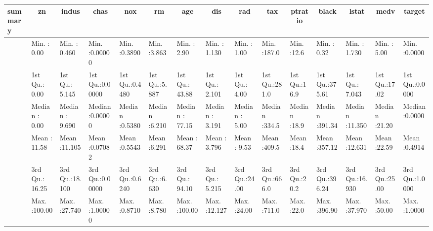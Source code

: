 \begin{table}[!tbp]
\begin{center}
\begin{tabular}{lllllllllllllll}
\hline\hline
\multicolumn{1}{l}{summary}&\multicolumn{1}{c}{      zn}&\multicolumn{1}{c}{    indus}&\multicolumn{1}{c}{     chas}&\multicolumn{1}{c}{     nox}&\multicolumn{1}{c}{      rm}&\multicolumn{1}{c}{     age}&\multicolumn{1}{c}{     dis}&\multicolumn{1}{c}{     rad}&\multicolumn{1}{c}{     tax}&\multicolumn{1}{c}{   ptratio}&\multicolumn{1}{c}{    black}&\multicolumn{1}{c}{    lstat}&\multicolumn{1}{c}{     medv}&\multicolumn{1}{c}{    target}\tabularnewline
\hline
&Min.   :  0.00  &Min.   : 0.460  &Min.   :0.00000  &Min.   :0.3890  &Min.   :3.863  &Min.   :  2.90  &Min.   : 1.130  &Min.   : 1.00  &Min.   :187.0  &Min.   :12.6  &Min.   :  0.32  &Min.   : 1.730  &Min.   : 5.00  &Min.   :0.0000  \tabularnewline
&1st Qu.:  0.00  &1st Qu.: 5.145  &1st Qu.:0.00000  &1st Qu.:0.4480  &1st Qu.:5.887  &1st Qu.: 43.88  &1st Qu.: 2.101  &1st Qu.: 4.00  &1st Qu.:281.0  &1st Qu.:16.9  &1st Qu.:375.61  &1st Qu.: 7.043  &1st Qu.:17.02  &1st Qu.:0.0000  \tabularnewline
&Median :  0.00  &Median : 9.690  &Median :0.00000  &Median :0.5380  &Median :6.210  &Median : 77.15  &Median : 3.191  &Median : 5.00  &Median :334.5  &Median :18.9  &Median :391.34  &Median :11.350  &Median :21.20  &Median :0.0000  \tabularnewline
&Mean   : 11.58  &Mean   :11.105  &Mean   :0.07082  &Mean   :0.5543  &Mean   :6.291  &Mean   : 68.37  &Mean   : 3.796  &Mean   : 9.53  &Mean   :409.5  &Mean   :18.4  &Mean   :357.12  &Mean   :12.631  &Mean   :22.59  &Mean   :0.4914  \tabularnewline
&3rd Qu.: 16.25  &3rd Qu.:18.100  &3rd Qu.:0.00000  &3rd Qu.:0.6240  &3rd Qu.:6.630  &3rd Qu.: 94.10  &3rd Qu.: 5.215  &3rd Qu.:24.00  &3rd Qu.:666.0  &3rd Qu.:20.2  &3rd Qu.:396.24  &3rd Qu.:16.930  &3rd Qu.:25.00  &3rd Qu.:1.0000  \tabularnewline
&Max.   :100.00  &Max.   :27.740  &Max.   :1.00000  &Max.   :0.8710  &Max.   :8.780  &Max.   :100.00  &Max.   :12.127  &Max.   :24.00  &Max.   :711.0  &Max.   :22.0  &Max.   :396.90  &Max.   :37.970  &Max.   :50.00  &Max.   :1.0000  \tabularnewline
\hline
\end{tabular}\end{center}

\end{table}
